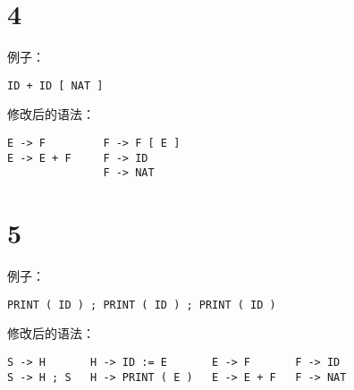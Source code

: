 \documentclass[12pt]{article}
\begin{document}
  \section*{4}

    例子：
    \begin{lstlisting}
ID + ID [ NAT ]
    \end{lstlisting}

    修改后的语法：
    \begin{lstlisting}
E -> F         F -> F [ E ]
E -> E + F     F -> ID
               F -> NAT
    \end{lstlisting}

  \section*{5}

    例子：
    \begin{lstlisting}
PRINT ( ID ) ; PRINT ( ID ) ; PRINT ( ID ) 
    \end{lstlisting}

    修改后的语法：
    \begin{lstlisting}
S -> H       H -> ID := E       E -> F       F -> ID
S -> H ; S   H -> PRINT ( E )   E -> E + F   F -> NAT
    \end{lstlisting}
\end{document}
